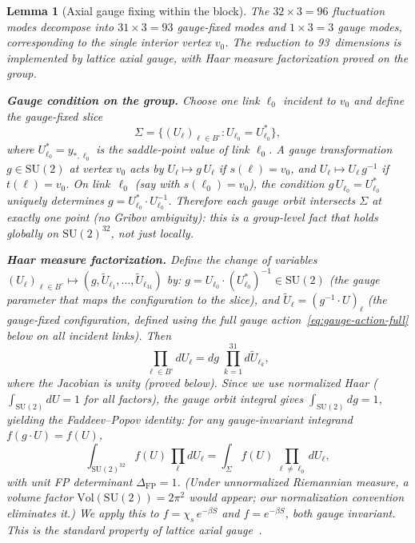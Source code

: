 \documentclass[11pt]{article}
\newtheorem{lemma}[theorem]{Lemma}
\theoremstyle{definition}
\newcommand{\SU}{\mathrm{SU}}
\begin{document}
\begin{lemma}[Axial gauge fixing within the block]\label{lem:axial}
The $32\times 3=96$ fluctuation modes decompose into
$31\times 3=93$ gauge-fixed modes and $1\times 3=3$ gauge modes,
corresponding to the single interior vertex $v_0$.
The reduction to 93~dimensions is implemented by lattice axial gauge,
with Haar measure factorization proved on the group.

\textbf{Gauge condition on the group.}
Choose one link $\ell_0$ incident to $v_0$ and define the
gauge-fixed slice
\begin{equation}\label{eq:gauge-slice}
\Sigma=\{(U_\ell)_{\ell\in B^\circ}:U_{\ell_0}=U_{\ell_0}^*\},
\end{equation}
where $U_{\ell_0}^*=y_{*,\ell_0}$ is the saddle-point value of
link $\ell_0$.  A gauge transformation $g\in\SU(2)$ at vertex
$v_0$ acts by $U_\ell\mapsto g\,U_\ell$ if $s(\ell)=v_0$, and
$U_\ell\mapsto U_\ell\,g^{-1}$ if $t(\ell)=v_0$.  On link~$\ell_0$
(say with $s(\ell_0)=v_0$), the condition $g\,U_{\ell_0}=U_{\ell_0}^*$
uniquely determines $g=U_{\ell_0}^*\cdot U_{\ell_0}^{-1}$.
Therefore each gauge orbit intersects $\Sigma$ at exactly one point
(no Gribov ambiguity): this is a \emph{group-level} fact that holds
globally on $\SU(2)^{32}$, not just locally.

\textbf{Haar measure factorization.}
Define the change of variables
$(U_\ell)_{\ell\in B^\circ}\mapsto(g,\widetilde{U}_{\ell_1},\ldots,
\widetilde{U}_{\ell_{31}})$ by:
$g=U_{\ell_0}\cdot(U_{\ell_0}^*)^{-1}\in\SU(2)$
(the gauge parameter that maps the
configuration to the slice), and
$\widetilde{U}_\ell=(g^{-1}\cdot U)_\ell$ (the gauge-fixed
configuration, defined using the full gauge action~\eqref{eq:gauge-action-full} below on all incident links).
Then
\begin{equation}\label{eq:haar-factor}
\prod_{\ell\in B^\circ}dU_\ell
=dg\;\prod_{k=1}^{31}d\widetilde{U}_{\ell_k},
\end{equation}
where the Jacobian is unity (proved below).
Since we use normalized Haar ($\int_{\SU(2)}dU=1$ for all factors),
the gauge orbit integral gives $\int_{\SU(2)}dg=1$,
yielding the Faddeev--Popov identity: for any gauge-invariant
integrand $f(g\cdot U)=f(U)$,
\begin{equation}\label{eq:FP}
\int_{\SU(2)^{32}}f(U)\,\prod_\ell dU_\ell
=\int_{\Sigma}
f(U)\,\prod_{\ell\ne\ell_0}dU_\ell,
\end{equation}
with \emph{unit FP determinant} $\Delta_{\mathrm{FP}}=1$.
(Under unnormalized Riemannian measure, a volume factor
$\mathrm{Vol}(\SU(2))=2\pi^2$ would appear; our normalization
convention eliminates it.)
We apply this to $f=\chi_s\,e^{-\beta S}$ and $f=e^{-\beta S}$,
both gauge invariant.  This is the standard property of lattice
axial gauge~\cite{Creutz}.


\end{lemma}
\end{document}
